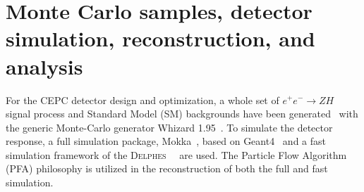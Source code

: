 \documentclass[a4paper,10pt,twoside]{cpc-hepnp}
\begin{document}


\section{Monte Carlo samples, detector simulation, reconstruction, and analysis\label{sec:simulation}}

For the CEPC detector design and optimization,
a whole set of $e^+e^- \to ZH$ signal process and Standard Model (SM) backgrounds have been generated~\cite{ref:cepccpc}
with the generic Monte-Carlo generator {\sf Whizard 1.95}{~\cite{ref:whizard}}.
To simulate the detector response, a full simulation package, Mokka{~\cite{ref:mokka}},
based on Geant4{~\cite{ref:geant4}} and a fast simulation framework of the {\textsc{Delphes}~}{~\cite{ref:delphes}} are used.  The Particle Flow Algorithm (PFA) philosophy is utilized in the reconstruction of both the full and fast simulation.
\end{document}
